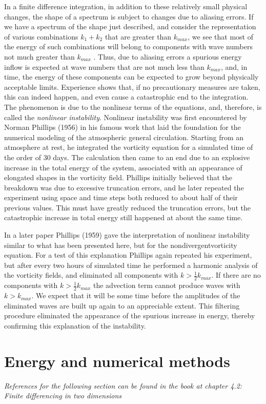 In a finite difference integration, in addition to these relatively small physical changes, the shape of a spectrum is subject to changes due to aliasing errors. If we have a spectrum of the shape just described, and consider the representation of various combinations $k_1+k_2$ that are greater than $k_{max}$, we see that most of the energy of such combinations will belong to components with wave numbers not much greater than $k_{max}$ . Thus, due to aliasing errors a spurious energy inflow is expected at wave numbers that are not much less than $k_{max}$, and, in time, the energy of these components can be expected to grow beyond physically acceptable limits. Experience shows that, if no precautionary measures are taken, this can indeed happen, and even cause a catastrophic end to the integration. The phenomenon is due to the nonlinear terms of the equations, and, therefore, is called the \textit{nonlinear instability}. Nonlinear instability was first encountered by Norman Phillips (1956) in his famous work that laid the foundation for the numerical modeling of the atmospheric general circulation. Starting from an atmosphere at rest, he integrated the vorticity equation for a simulated time of the order of 30 days. The calculation then came to an end due to an explosive increase in the total energy of the system, associated with an appearance of elongated shapes in the vorticity field. Phillips initially believed that the breakdown was due to excessive truncation errors, and he later repeated the experiment using space and time steps both reduced to about half of their previous values. This must have greatly reduced the truncation errors, but the catastrophic increase in total energy still happened at about the same time.

In a later paper Phillips (1959) gave the interpretation of nonlinear instability similar to what has been presented here, but for the nondivergentvorticity equation. For a test of this explanation Phillips again repeated his experiment, but after every two hours of simulated time he performed a harmonic analysis of the vorticity fields, and eliminated all components with $k>\frac{1}{2}k_{max}$. If there are no components with $k>\frac{1}{2}k_{max}$ the advection term cannot produce waves with $k>k_{max}$. We expect that it will be some time before the amplitudes of the eliminated waves are built up again to an appreciable extent. This filtering procedure eliminated the appearance of the spurious increase in energy, thereby confirming this explanation of the instability.
\section{Energy and numerical methods}\label{sec:en and numerical methods}
\begin{center}
	\textit{References for the following section can be found in the book at chapter 4.2: Finite differencing in two dimensions}
\end{center}

